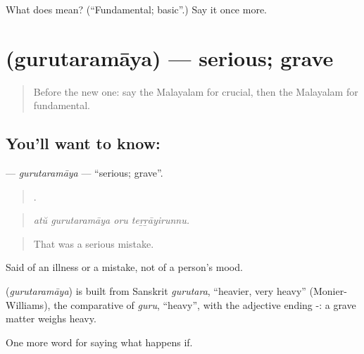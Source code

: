 \begin{tcolorbox}[breakable,colback=teal!4,colframe=teal!35!black,title={Before you move on}]
What does  mean? (\textquotedblleft{}Fundamental; basic\textquotedblright{}.) Say it once more.
\end{tcolorbox}
\section[\texorpdfstring{\ml{ഗുരുതരമായ} (gurutaramāya)}{ഗുരുതരമായ (gurutaramāya)}]{ (gurutaramāya) — serious; grave}

\label{lesson:ML-C445-gurutaramaya}



\begin{quote}
Before the new one: say the Malayalam for crucial, then the Malayalam for fundamental.
\end{quote}

\subsection*{You'll want to know: }
\textbf{} — \emph{gurutaramāya} — \textquotedblleft{}serious; grave\textquotedblright{}.

\begin{quote}
   .
\end{quote}

\begin{quote}
\emph{atŭ gurutaramāya oru teṟṟāyirunnu.}
\end{quote}

\begin{quote}
That was a serious mistake.
\end{quote}

Said of an illness or a mistake, not of a person's mood.

\begin{cousinweb}
\textbf{} (\emph{gurutaramāya}) is built from Sanskrit \emph{gurutara}, \textquotedblleft{}heavier, very heavy\textquotedblright{} (Monier-Williams), the comparative of \emph{guru}, \textquotedblleft{}heavy\textquotedblright{}, with the adjective ending -: a grave matter weighs heavy.
\end{cousinweb}

\begin{grammarlens}[title={What you've built}]
One more word for saying what happens if.
\end{grammarlens}

